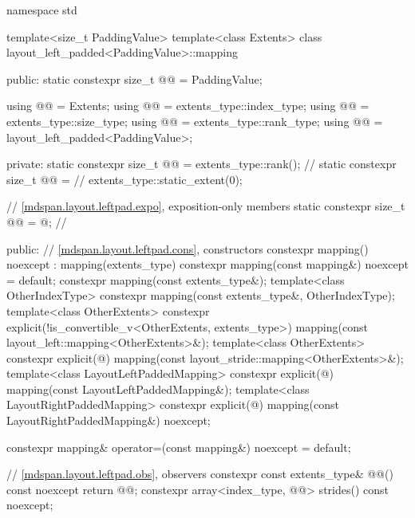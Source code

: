 %
\begin{codeblock}
namespace std {
  template<size_t PaddingValue>
  template<class Extents>
  class layout_left_padded<PaddingValue>::mapping {
  public:
    static constexpr size_t @@ = PaddingValue;

    using @@ = Extents;
    using @@ = extents_type::index_type;
    using @@ = extents_type::size_type;
    using @@ = extents_type::rank_type;
    using @@ = layout_left_padded<PaddingValue>;

  private:
    static constexpr size_t @@ = extents_type::rank();         // \expos
    static constexpr size_t @@ =                 // \expos
      extents_type::static_extent(0);

    // \ref{mdspan.layout.leftpad.expo}, exposition-only members
    static constexpr size_t @@ = @\seebelow@;  // \expos

  public:
    // \ref{mdspan.layout.leftpad.cons}, constructors
    constexpr mapping() noexcept : mapping(extents_type{}) {}
    constexpr mapping(const mapping&) noexcept = default;
    constexpr mapping(const extents_type&);
    template<class OtherIndexType>
      constexpr mapping(const extents_type&, OtherIndexType);
    template<class OtherExtents>
      constexpr explicit(!is_convertible_v<OtherExtents, extents_type>)
        mapping(const layout_left::mapping<OtherExtents>&);
    template<class OtherExtents>
      constexpr explicit(@\seebelow@)
        mapping(const layout_stride::mapping<OtherExtents>&);
    template<class LayoutLeftPaddedMapping>
      constexpr explicit(@\seebelow@)
        mapping(const LayoutLeftPaddedMapping&);
    template<class LayoutRightPaddedMapping>
      constexpr explicit(@\seebelow@)
        mapping(const LayoutRightPaddedMapping&) noexcept;

    constexpr mapping& operator=(const mapping&) noexcept = default;

    // \ref{mdspan.layout.leftpad.obs}, observers
    constexpr const extents_type& @@() const noexcept { return @@; }
    constexpr array<index_type, @@> strides() const noexcept;

}}
\end{codeblock}
